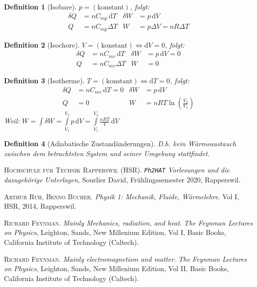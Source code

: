\documentclass[a4paper, twocolumn]{article}
\numberwithin{equation}{section}
\theoremstyle{hsr-def}
\newtheorem{definition}{Definition}[section]
\theoremstyle{hsr-sub}
\newcommand{\dd}[1]{\ensuremath{\mathrm{d}#1}}
\newcommand{\di}[1]{\,\dd{#1}}
\begin{document}
\begin{definition}[Isobare]
\(
    p = \left(\text{konstant}\right)
\), folgt:
\begin{align*}
    \delta Q &= nC_{mp} \di{T} &
    \delta W &= p \di{V}
    \\
     Q &= nC_{mp} \Delta T &
     W &= p\Delta V = nR \Delta T
\end{align*}
\end{definition}

\begin{definition}[Isochore]
\(
    V = \left(\text{konstant}\right) \iff \dd{V} = 0
\), folgt:
\begin{align*}
    \delta Q &= nC_{mv} \di{T} &
    \delta W &= p \di{V} = 0
    \\
     Q &= nC_{mv} \Delta T &
     W &= 0
\end{align*}
\end{definition}

\begin{definition}[Isotherme]
\(
    T = \left(\text{konstant}\right) \iff \dd{T} = 0
\), folgt:
\begin{align*}
    \delta Q &= nC_{mv} \di{T} = 0 & 
    \delta W &= p \di{V}
    \\
     Q &= 0 &
     W &= nRT\ln\left(\frac{V_2}{V_1}\right)
\end{align*}
Weil:
\(\displaystyle
    W = \int \delta W 
    = \int\limits_{V_1}^{V_2} p \di{V}
    = \int\limits_{V_1}^{V_2} \frac{nRT}{V} \di{V}
\)
\end{definition}

\begin{definition}[Adiabatische Zustand\"anderungen] D.h. \emph{kein} W\"armeaustauch zwischen dem betrachteten System und seiner Umgebung stattfindet.

\end{definition}

\begin{thebibliography}{2}
    \textsc{Hochschule f\"ur Technik Rapperswil (HSR)}.
    \textit{\texttt{Ph2HAT} Vorlesungen und die dazugeh\"orige Unterlagen,}
    Sourlier David,
    Fr\"uhlingssemester 2020,
    Rapperswil.

    \textsc{Arthur Ruh, Benno Bucher}.
    \textit{Physik 1: Mechanik, Fluide, W\"armelehre}.
    Vol I, HSR, 2014, Rapperswil.

    \textsc{Richard Feynman}.
    \textit{Mainly Mechanics, radiation, and heat}.
    \textit{The Feynman Lectures on Physics},
    Leighton, Sands,
    New Millenium Edition,
    Vol I,
    Basic Books,
    California Institute of Technology (Caltech).

    \textsc{Richard Feynman}.
    \textit{Mainly electromagnetism and matter}.
    \textit{The Feynman Lectures on Physics},
    Leighton, Sands,
    New Millenium Edition,
    Vol II,
    Basic Books,
    California Institute of Technology (Caltech).

\end{thebibliography}
\end{document}
